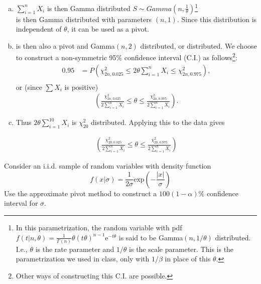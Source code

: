 \documentclass[12pt]{article}
\newenvironment{question}[2][Question]{\begin{trivlist}
\item[\hskip \labelsep {\bfseries #1}\hskip \labelsep {\bfseries #2.}]}{\end{trivlist}}
\begin{document}
\begin{enumerate}[(a)]
\item $\sum_{i=1}^{n} X_i$ is then Gamma distributed  $S \sim Gamma(n, \frac{1}{\theta})$\footnote{In this parametrization, the random variable with pdf 
$
f(t | n, \theta) = \frac{1}{\Gamma(n)}   \theta  \left( t\theta\right)^{n - 1}   \mathrm{e}^{-t\theta}
$ is said to be Gamma$(n, 1/\theta)$ distributed. I.e., $\theta$ is the rate parameter and $1/\theta$ is the scale parameter. This is the parametrization we used in class, only with $1/\beta$ in place of this $\theta$.}\\
 is then Gamma distributed with parameters $(n, 1)$. Since this distribution is independent of $\theta$, it can be used as a pivot. 

\item {} is then also a pivot and Gamma$(n, 2)$ distributed, or  distributed.  We choose to construct a non-symmetric 95\% confidence interval (C.I.) as follows\footnote{Other ways of constructing this C.I. are possible.}:
\begin{align*}
0 .95 &= P\left(\chi^2_{2n, 0.025} \leq 2 \theta \sum_{i=1}^{n} X_i \leq \chi^2_{2n, 0.975}\right),\\
\end{align*}
or (since $\sum X_i$ is positive)
\begin{align*}
\left( \frac{\chi^2_{2n, 0.025} }{2 \sum_{i=1}^{n} X_i} \leq  \theta  \leq  \frac{\chi^2_{2n, 0.975} }{2\sum_{i=1}^{n} X_i} \right).
\end{align*}


\item Thus $2 \theta \sum_{i=1}^{10} X_i$ is $\chi^2_{20}$ distributed. Applying this to the data gives

\begin{align*}
\left( \frac{\chi^2_{20, 0.025} }{2 \sum_{i=1}^{n} X_i} \leq  \theta  \leq  \frac{\chi^2_{20, 0.975} }{2\sum_{i=1}^{n} X_i} \right) 
\end{align*}

\begin{center}
\boxed{$$\left[\  0.3,  1.07 \ \right] $$}
\end{center}
\end{enumerate}

\bigskip
\bigskip
 \begin{question}{8.2}  Consider an i.i.d. sample of random variables with density function
 $$
 f(x | \sigma) = \frac{1}{2\sigma} \mathrm{exp}(-\frac{|x|}{\sigma})
 $$
 Use the approximate pivot method to construct a $100(1 - \alpha)\%$ confidence interval for $\sigma$.
\end{question} 
\end{document}
